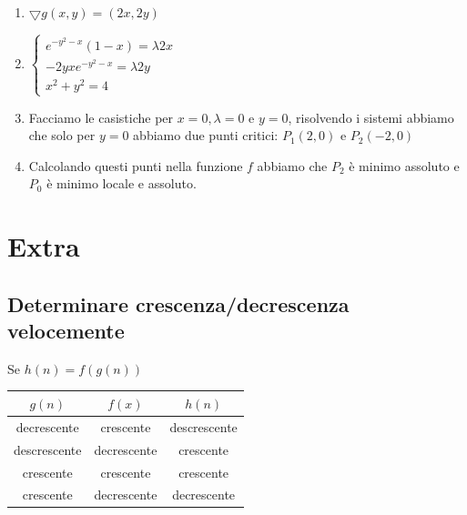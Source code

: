 \documentclass[10pt, a4paper]{article}
\begin{document}
\begin{itemize}
\begin{enumerate}
\begin{enumerate}
\begin{enumerate}
                    \item $\displaystyle \bigtriangledown g(x,y)=(2x,2y)$ 
                    \item $\begin{cases}
                        e^{-y^2-x}(1-x) = \lambda 2x\\
                        -2yxe^{-y^2-x} = \lambda 2y\\
                        x^2+y^2=4
                    \end{cases}$
                    \item Facciamo le casistiche per $x=0,\lambda=0$ e $y=0$, risolvendo i sistemi abbiamo che solo per $y=0$ abbiamo due punti critici: $P_1(2,0)$ e $P_2(-2,0)$
                    \item Calcolando questi punti nella funzione $f$ abbiamo che $P_2$ è minimo assoluto e $P_0$ è minimo locale e assoluto.
                \end{enumerate}
            \end{enumerate}
        \end{enumerate}
    \end{itemize}
    \newpage
\section{Extra}
    \subsection{Determinare crescenza/decrescenza velocemente}
        Se $h(n)=f(g(n))$
        \begin{center}
            \begin{tabular}{| c | c | c |}
                \hline
                $g(n)$ & $f(x)$ & $h(n)$\\
                \hline
                decrescente & crescente & descrescente\\
                \hline
                descrescente & decrescente & crescente\\
                \hline
                crescente & crescente & crescente\\
                \hline
                crescente & decrescente & decrescente\\
                \hline
            \end{tabular}
        \end{center}
\end{document}

